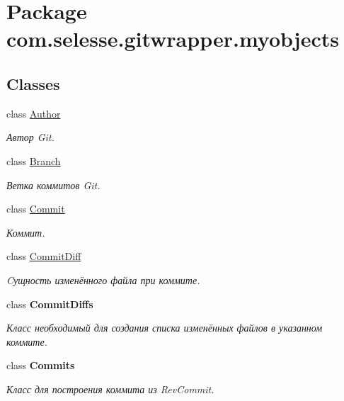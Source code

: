 \hypertarget{namespacecom_1_1selesse_1_1gitwrapper_1_1myobjects}{}\section{Package com.\+selesse.\+gitwrapper.\+myobjects}
\label{namespacecom_1_1selesse_1_1gitwrapper_1_1myobjects}
\subsection*{Classes}
\begin{DoxyCompactItemize}
\item 
class \hyperlink{classcom_1_1selesse_1_1gitwrapper_1_1myobjects_1_1_author}{Author}
\begin{DoxyCompactList}\small\item\em Автор Git. \end{DoxyCompactList}\item 
class \hyperlink{classcom_1_1selesse_1_1gitwrapper_1_1myobjects_1_1_branch}{Branch}
\begin{DoxyCompactList}\small\item\em Ветка коммитов Git. \end{DoxyCompactList}\item 
class \hyperlink{classcom_1_1selesse_1_1gitwrapper_1_1myobjects_1_1_commit}{Commit}
\begin{DoxyCompactList}\small\item\em Коммит. \end{DoxyCompactList}\item 
class \hyperlink{classcom_1_1selesse_1_1gitwrapper_1_1myobjects_1_1_commit_diff}{Commit\+Diff}
\begin{DoxyCompactList}\small\item\em Cущность изменённого файла при коммите. \end{DoxyCompactList}\item 
class {\bfseries Commit\+Diffs}
\begin{DoxyCompactList}\small\item\em Класс необходимый для создания списка изменённых файлов в указанном коммите. \end{DoxyCompactList}\item 
class {\bfseries Commits}
\begin{DoxyCompactList}\small\item\em Класс для построения коммита из Rev\+Commit. \end{DoxyCompactList}\item 

\end{DoxyCompactItemize}
